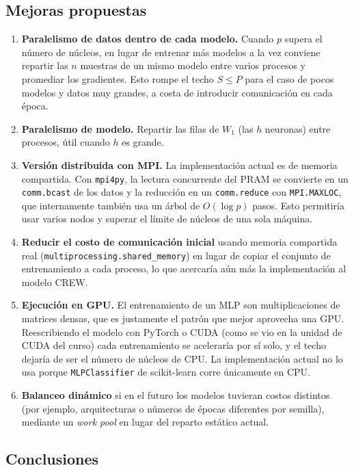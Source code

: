 \documentclass[11pt,a4paper]{article}
\begin{document}
\subsection{Mejoras propuestas}

\begin{enumerate}[leftmargin=1.2cm]
\item \textbf{Paralelismo de datos dentro de cada modelo.} Cuando $p$ supera el número de núcleos, en lugar de entrenar más modelos a la vez conviene repartir las $n$ muestras de un mismo modelo entre varios procesos y promediar los gradientes. Esto rompe el techo $S\le P$ para el caso de pocos modelos y datos muy grandes, a costa de introducir comunicación en cada época.
\item \textbf{Paralelismo de modelo.} Repartir las filas de $W_1$ (las $h$ neuronas) entre procesos, útil cuando $h$ es grande.
\item \textbf{Versión distribuida con MPI.} La implementación actual es de memoria compartida. Con \texttt{mpi4py}, la lectura concurrente del PRAM se convierte en un \texttt{comm.bcast} de los datos y la reducción en un \texttt{comm.reduce} con \texttt{MPI.MAXLOC}, que internamente también usa un árbol de $O(\log p)$ pasos. Esto permitiría usar varios nodos y superar el límite de núcleos de una sola máquina.
\item \textbf{Reducir el costo de comunicación inicial} usando memoria compartida real (\texttt{multiprocessing.shared\_memory}) en lugar de copiar el conjunto de entrenamiento a cada proceso, lo que acercaría aún más la implementación al modelo CREW.
\item \textbf{Ejecución en GPU.} El entrenamiento de un MLP son multiplicaciones de matrices densas, que es justamente el patrón que mejor aprovecha una GPU. Reescribiendo el modelo con PyTorch o CUDA (como se vio en la unidad de CUDA del curso) cada entrenamiento se aceleraría por sí solo, y el techo dejaría de ser el número de núcleos de CPU. La implementación actual no lo usa porque \texttt{MLPClassifier} de scikit-learn corre únicamente en CPU.
\item \textbf{Balanceo dinámico} si en el futuro los modelos tuvieran costos distintos (por ejemplo, arquitecturas o números de épocas diferentes por semilla), mediante un \emph{work pool} en lugar del reparto estático actual.
\end{enumerate}

\subsection{Conclusiones}
\end{document}
